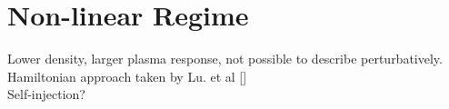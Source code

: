 


\section{Non-linear Regime} 
Lower density, larger plasma response, not possible to describe perturbatively. Hamiltonian approach taken by Lu. et al []\\
Self-injection?